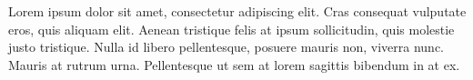 
\renewcommand{\dedicatorianame}{DEDICATÓRIA}

\begin{dedicatoria}

Lorem ipsum dolor sit amet, consectetur adipiscing elit. Cras consequat vulputate eros, quis aliquam elit. Aenean tristique felis at ipsum sollicitudin, quis molestie justo tristique. Nulla id libero pellentesque, posuere mauris non, viverra nunc. Mauris at rutrum urna. Pellentesque ut sem at lorem sagittis bibendum in at ex. 

\end{dedicatoria}
